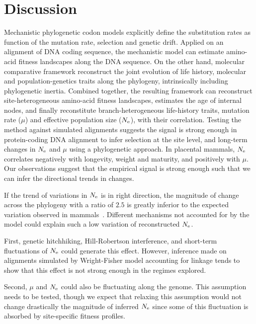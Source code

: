 \section{Discussion}
\label{sec:Discussion}
Mechanistic phylogenetic codon models explicitly define the substitution rates as function of the mutation rate, selection and genetic drift.
Applied on an alignment of \acrshort{DNA} coding sequence, the mechanistic model can estimate amino-acid fitness landscapes along the \acrshort{DNA} sequence.
On the other hand, molecular comparative framework reconstruct the joint evolution of life history, molecular and population-genetics traits along the phylogeny, intrinsically including phylogenetic inertia.
Combined together, the resulting framework can reconstruct site-heterogeneous amino-acid fitness landscapes, estimates the age of internal nodes, and finally reconstitute branch-heterogeneous life-history traits, mutation rate ($\mu$) and effective population size ($N_{\mathrm{e}}$), with their correlation.
Testing the method against simulated alignments suggests the signal is strong enough in protein-coding \acrshort{DNA} alignment to infer selection at the site level, and long-term changes in $N_{\mathrm{e}}$ and $\mu$ using a phylogenetic approach.
In placental mammals, $N_{\mathrm{e}}$ correlates negatively with longevity, weight and maturity, and positively with $\mu$.
Our observations suggest that the empirical signal is strong enough such that we can infer the directional trends in changes.

If the trend of variations in $N_{\mathrm{e}}$ is in right direction, the magnitude of change across the phylogeny with a ratio of $2.5$ is greatly inferior to the expected variation observed in mammals~\citep{Galtier2016, Brevet2019}.
Different mechanisms not accounted for by the model could explain such a low variation of reconstructed $N_{\mathrm{e}}$.

First, genetic hitchhiking, Hill-Robertson interference, and short-term fluctuations of $N_{\mathrm{e}}$ could generate this effect.
However, inference made on alignments simulated by Wright-Fisher model accounting for linkage tends to show that this effect is not strong enough in the regimes explored.

Second, $\mu$ and $N_{\mathrm{e}}$ could also be fluctuating along the genome.
This assumption needs to be tested, though we expect that relaxing this assumption would not change drastically the magnitude of inferred $N_{\mathrm{e}}$ since some of this fluctuation is absorbed by site-specific fitness profiles.

